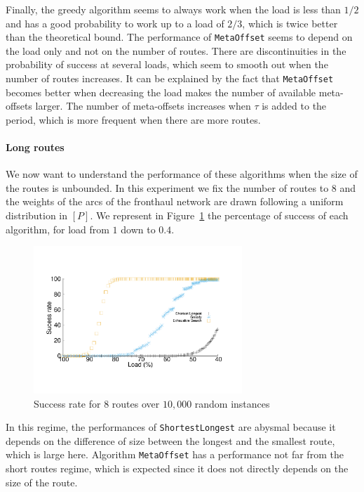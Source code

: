 \documentclass[a4paper,10pt]{journal}
\newcommand\shortestlongest{\texttt{ShortestLongest}\xspace}
\newcommand\metaoffset{\texttt{MetaOffset}\xspace}
\begin{document}
      Finally, the greedy algorithm seems to always work when the load is less than $1/2$ and has a good probability to work up to a load of $2/3$, which is twice better than the theoretical bound. The performance of \metaoffset seems to depend on the load only and not on the number of routes. There are discontinuities in the probability of success at several loads, which seem to smooth out when the number of routes increases. It can be explained by the fact that \metaoffset becomes better when decreasing the load makes the number of available meta-offsets larger. The number of meta-offsets increases when $\tau$ is added to the period, which is more frequent when there are more routes.
      
        \paragraph{Long routes}
      
      We now want to understand the performance of these algorithms when the size of the routes is unbounded. In this experiment we fix the number of routes to $8$ and the weights of the arcs of the fronthaul network are drawn following a uniform distribution in $[P]$. We represent in Figure~\ref{fig:long} the percentage of success of each algorithm, for load from $1$ down to $0.4$.
\begin{figure}[h]

       \begin{center}
      \includegraphics[width=0.7\textwidth]{echec_longues.pdf}
      \end{center}
        
      \caption{Success rate for $8$ routes over $10,000$ random instances}\label{fig:long}
     \end{figure}
      
In this regime, the performances of \shortestlongest are abysmal because it depends on the difference of size between the longest and the smallest route, which is large here.  Algorithm \metaoffset has a performance not far from the short routes regime, which is expected since it does not directly depends on the size of the route. 
      
\end{document}
